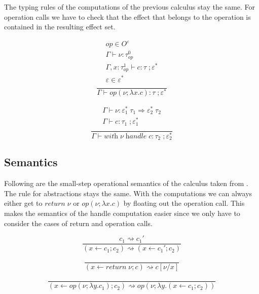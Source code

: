 \documentclass[12pt]{article}
\newcommand\eff[0]{\varepsilon}
\newcommand\effs[0]{\eff^*}
\newcommand\eop[0]{\textit{op}}
\newcommand\eops[1]{O^{#1}}
\newcommand\type[0]{\tau}
\newcommand\thandler[4]{#1 \; #2 \Rightarrow #3 \; #4}
\newcommand\val[0]{\nu}
\newcommand\comp[0]{c}
\newcommand\creturn[1]{\textit{return} \; #1}
\newcommand\cop[4]{#1(#2 ; \lambda #3 . #4)}
\newcommand\cdo[3]{#1 \leftarrow #2 ; #3}
\newcommand\chandle[2]{\textit{with} \; #1 \; \textit{handle} \; #2}
\begin{document}
The typing rules of the computations of the previous calculus stay the same. For operation calls we have to check that the effect that belongs to the operation is contained in the resulting effect set. \\
\begin{minipage}{0.5\textwidth}
\[\frac{
	\begin{array}{l}
	\eop \in \eops{\eff} \\
	\Gamma \vdash \val : \type^0_\eop \\
	\Gamma , x : \type^1_\eop \vdash \comp : \type \; ; \effs \\
	\eff \in \effs \\
	\end{array}
}{
	\Gamma \vdash \cop{\eop}{\val}{x}{\comp} : \type \; ; \effs
}\]
\end{minipage}
\begin{minipage}{0.5\textwidth}
\[\frac{
	\begin{array}{l}
	\Gamma \vdash \val : \thandler{\effs_1}{\type_1}{\effs_2}{\type_2} \\
	\Gamma \vdash \comp : \type_1 \; ; \effs_1 \\
	\end{array}
}{
	\Gamma \vdash \chandle{\val}{\comp} : \type_2 \; ; \effs_2
}\]
\end{minipage}

\subsection{Semantics}

Following are the small-step operational semantics of the calculus taken from \cite{pretnar}.
The rule for abstractions stays the same.
With the computations we can always either get to $\creturn{\val}$ or $\cop{\eop}{\val}{x}{\comp}$ by floating out the operation call.
This makes the semantics of the handle computation easier since we only have to consider the cases of return and operation calls.

\begin{minipage}{0.5\textwidth}
\[\frac{
	\comp_1 \rightsquigarrow \comp_1'
}{
	(\cdo{x}{\comp_1}{\comp_2}) \rightsquigarrow (\cdo{x}{\comp_1'}{\comp_2})
}\]
\end{minipage}
\begin{minipage}{0.5\textwidth}
\[\frac{
}{
	(\cdo{x}{\creturn{\val}}{\comp}) \rightsquigarrow \comp[\val / x]
}\]
\end{minipage}
\[\frac{
}{
	(\cdo{x}{\cop{\eop}{\val}{y}{\comp_1}}{\comp_2}) \rightsquigarrow \cop{\eop}{\val}{y}{(\cdo{x}{\comp_1}{\comp_2})}
}\]
\end{document}
